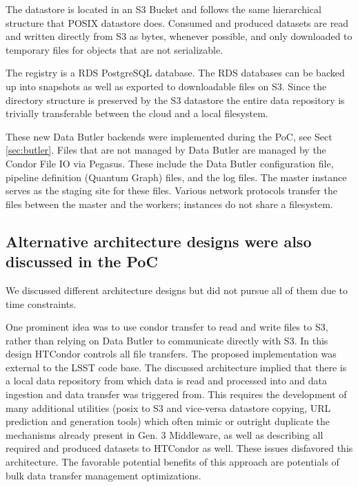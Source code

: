 The datastore is located in an S3 Bucket and follows the same hierarchical structure that POSIX datastore does. Consumed and produced datasets are read and written directly from S3 as bytes, whenever possible, and only downloaded to temporary files for objects that are not serializable.

The registry is a RDS PostgreSQL database. The RDS databases can be backed up into snapshots as well as exported to downloadable files on S3. Since the directory structure is preserved by the S3 datastore the entire data repository is trivially transferable between the cloud and a local filesystem.

These new Data Butler backends were implemented during the PoC, see Sect \ref{sec:butler}. Files that are not managed by Data Butler are managed by the Condor File IO via Pegasus. These include the Data Butler configuration file, pipeline definition (Quantum Graph) files, and the log files. The master instance serves as the staging site for these files. Various network protocols transfer the files between the master and the workers; instances do not share a filesystem.

\subsection{Alternative architecture designs were also discussed in the PoC}

We discussed different architecture designs but did not pursue all of them due to time constraints.

One prominent idea was to use condor transfer to read and write files to S3, rather than relying on Data Butler to communicate directly with S3. In this design HTCondor controls all file transfers. The proposed implementation was external to the LSST code base. The discussed architecture implied that there is a local data repository from which data is read and processed into and data ingestion and data transfer was triggered from. This requires the development of many additional utilities (posix to S3 and vice-versa datastore copying, URL prediction and generation tools) which often mimic or outright duplicate the mechanisms already present in Gen. 3 Middleware, as well as describing all required and produced datasets to HTCondor as well. These issues disfavored this architecture. The favorable potential benefits of this approach are potentials of bulk data transfer management optimizations.

